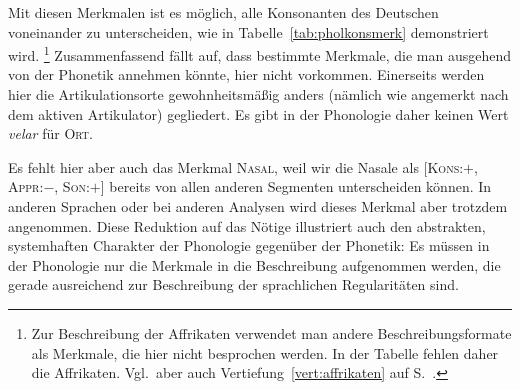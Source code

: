 \newpage

Mit diesen Merkmalen ist es möglich, alle Konsonanten des Deutschen voneinander zu unterscheiden, wie in Tabelle~\ref{tab:pholkonsmerk} demonstriert wird.%
\footnote{Zur Beschreibung der Affrikaten verwendet man andere Beschreibungsformate als Merkmale, die hier nicht besprochen werden.
In der Tabelle fehlen daher die Affrikaten.
Vgl.\ aber auch Vertiefung~\ref{vert:affrikaten} auf S.~\pageref{vert:affrikaten}.}
Zusammenfassend fällt auf, dass bestimmte Merkmale, die man ausgehend von der Phonetik annehmen könnte, hier nicht vorkommen.
Einerseits werden hier die Artikulationsorte gewohnheitsmäßig anders (nämlich wie angemerkt nach dem aktiven Artikulator) gegliedert.
Es gibt in der Phonologie daher \zB keinen Wert \textit{velar} für \textsc{Ort}.


Es fehlt hier aber auch das Merkmal \textsc{Nasal}, weil wir die Nasale als [\textsc{Kons}:$+$, \textsc{Appr}:$-$, \textsc{Son}:$+$] bereits von allen anderen Segmenten unterscheiden können.
In anderen Sprachen oder bei anderen Analysen wird dieses Merkmal aber trotzdem angenommen.
Diese Reduktion auf das Nötige illustriert auch den abstrakten, systemhaften Charakter der Phonologie gegenüber der Phonetik:
Es müssen in der Phonologie nur die Merkmale in die Beschreibung aufgenommen werden, die gerade ausreichend zur Beschreibung der sprachlichen Regularitäten sind.

